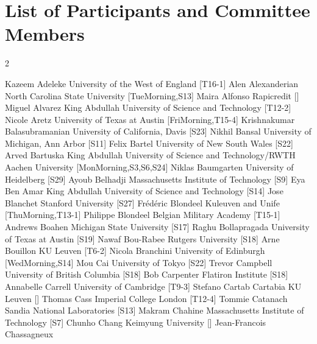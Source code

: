 \documentclass[12pt,lettersize,oneside]{book} %
\begin{document}
\chapter{List of Participants and Committee Members}
\setlength{\columnsep}{1cm}
\begin{multicols}{2}
\small\raggedright
\participantne
  {Kazeem Adeleke}
  {University of the West of England}
  [T16-1]
\participantne
  {Alen Alexanderian}
  {North Carolina State University}
  [TueMorning,S13]
\participantne
  {Maira Alfonso}
  {Rapicredit}
  []
\participantne
  {Miguel Alvarez}
  {King Abdullah University of Science and Technology}
  [T12-2]
\participantne
  {Nicole Aretz}
  {University of Texas at Austin}
  [FriMorning,T15-4]
\participantne
  {Krishnakumar Balasubramanian}
  {University of California, Davis}
  [S23]
\participantne
  {Nikhil Bansal}
  {University of Michigan, Ann Arbor}
  [S11]
\participantne
  {Felix Bartel}
  {University of New South Wales}
  [S22]
\participantne
  {Arved Bartuska}
  {King Abdullah University of Science and Technology/RWTH Aachen University}
  [MonMorning,S3,S6,S24]
\participantne
  {Niklas Baumgarten}
  {University of Heidelberg}
  [S29]
\participantne
  {Ayoub Belhadji}
  {Massachusetts Institute of Technology}
  [S9]
\participantne
  {Eya Ben Amar}
  {King Abdullah University of Science and Technology}
  [S14]
\participantne
  {Jose Blanchet}
  {Stanford University}
  [S27]
\participantne
  {Fr\'ed\'eric Blondeel}
  {Kuleuven and Unife}
  [ThuMorning,T13-1]
\participantne
  {Philippe Blondeel}
  {Belgian Military Academy}
  [T15-1]
\participantne
  {Andrews Boahen}
  {Michigan State University}
  [S17]
\participantne
  {Raghu Bollapragada}
  {University of Texas at Austin}
  [S19]
\participantne
  {Nawaf Bou-Rabee}
  {Rutgers University}
  [S18]
\participantne
  {Arne Bouillon}
  {KU Leuven}
  [T6-2]
\participantne
  {Nicola Branchini}
  {University of Edinburgh}
  [WedMorning,S14]
\participantne
  {Mou Cai}
  {University of Tokyo}
  [S22]
\participantne
  {Trevor Campbell}
  {University of British Columbia}
  [S18]
\participantne
  {Bob Carpenter}
  {Flatiron Institute}
  [S18]
\participantne
  {Annabelle Carrell}
  {University of Cambridge}
  [T9-3]
\participantne
  {Stefano Cartab Cartabia}
  {KU Leuven}
  []
\participantne
  {Thomas Cass}
  {Imperial College London}
  [T12-4]
\participantne
  {Tommie Catanach}
  {Sandia National Laboratories}
  [S13]
\participantne
  {Makram Chahine}
  {Massachusetts Institute of Technology}
  [S7]
\participantne
  {Chunho Chang}
  {Keimyung University}
  []
\participantne
  {Jean-Francois Chassagneux}

\end{multicols}
\end{document}
